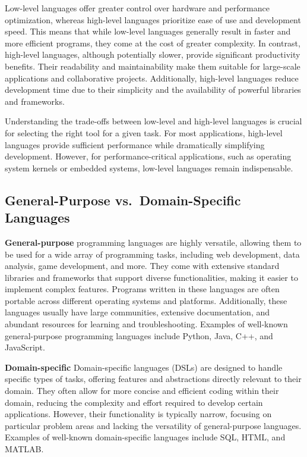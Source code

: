 \documentclass[
  letterpaper,
  DIV=11,
  numbers=noendperiod]{scrreprt}
\begin{document}
Low-level languages offer greater control over hardware and performance
optimization, whereas high-level languages prioritize ease of use and
development speed. This means that while low-level languages generally
result in faster and more efficient programs, they come at the cost of
greater complexity. In contrast, high-level languages, although
potentially slower, provide significant productivity benefits. Their
readability and maintainability make them suitable for large-scale
applications and collaborative projects. Additionally, high-level
languages reduce development time due to their simplicity and the
availability of powerful libraries and frameworks.

Understanding the trade-offs between low-level and high-level languages
is crucial for selecting the right tool for a given task. For most
applications, high-level languages provide sufficient performance while
dramatically simplifying development. However, for performance-critical
applications, such as operating system kernels or embedded systems,
low-level languages remain indispensable.

\hypertarget{general-purpose-vs.-domain-specific-languages}{%
\subsection{General-Purpose vs.~Domain-Specific
Languages}\label{general-purpose-vs.-domain-specific-languages}}

\textbf{General-purpose} programming languages are highly versatile,
allowing them to be used for a wide array of programming tasks,
including web development, data analysis, game development, and more.
They come with extensive standard libraries and frameworks that support
diverse functionalities, making it easier to implement complex features.
Programs written in these languages are often portable across different
operating systems and platforms. Additionally, these languages usually
have large communities, extensive documentation, and abundant resources
for learning and troubleshooting. Examples of well-known general-purpose
programming languages include Python, Java, C++, and JavaScript.

\textbf{Domain-specific} Domain-specific languages (DSLs) are designed
to handle specific types of tasks, offering features and abstractions
directly relevant to their domain. They often allow for more concise and
efficient coding within their domain, reducing the complexity and effort
required to develop certain applications. However, their functionality
is typically narrow, focusing on particular problem areas and lacking
the versatility of general-purpose languages. Examples of well-known
domain-specific languages include SQL, HTML, and MATLAB.
\end{document}
